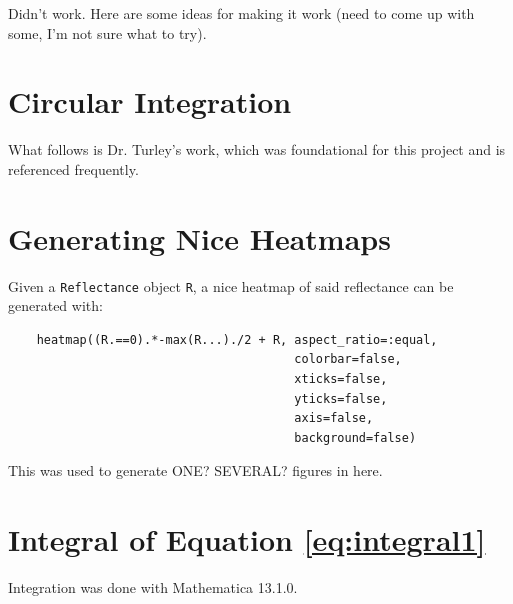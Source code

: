 \documentclass[etd,twoside,senior]{BYUPhys}
\begin{document}
Didn't work. Here are some ideas for making it work (need to come up with some, I'm not sure what to try).







\begin{appendices}

  \chapter{Circular Integration}\label{chap:circular_integration}
  
  What follows is Dr. Turley's work, which was foundational for this project and is referenced frequently.
  
  
  
  
  
  \chapter{Generating Nice Heatmaps}\label{chap:heatmap_code}
  
  Given a \texttt{Reflectance} object \texttt{R}, a nice heatmap of said reflectance can be generated with:
  
  \begin{verbatim}
    heatmap((R.==0).*-max(R...)./2 + R, aspect_ratio=:equal,
                                        colorbar=false,
                                        xticks=false,
                                        yticks=false,
                                        axis=false,
                                        background=false)
  \end{verbatim}
  
  This was used to generate ONE? SEVERAL? figures in here.
  
  
  
  \chapter{Integral of Equation \ref{eq:integral1}}\label{chap:integral}
  
  Integration was done with Mathematica 13.1.0.
  

\end{appendices}
\end{document}
